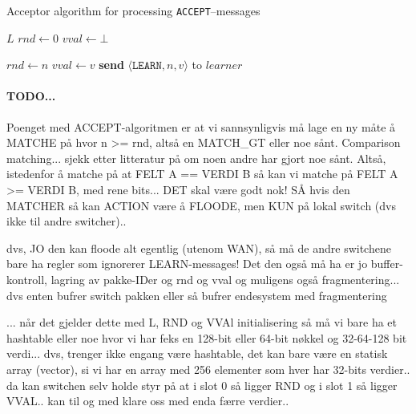 \begin{algorithm}[H]
  \caption{Acceptor algorithm for processing \texttt{ACCEPT}--messages}
  \label{paxos.algorithm.acceptor}
  \begin{algorithmic}
    \State $L$
    \State $rnd \leftarrow 0$ 
    \State $vval \leftarrow \bot$ 

        \State $rnd\gets n$
        \State $vval\gets v$
           \State \textbf{send} $\langle \texttt{LEARN}, n, v \rangle $ to $learner$
        \EndForIn
      \EndIf
    \EndOn
  \end{algorithmic}
\end{algorithm}

\paragraph{TODO...}

Poenget med ACCEPT-algoritmen er at vi sannsynligvis må lage en ny måte å
MATCHE på hvor n >= rnd, altså en MATCH\_{}GT eller noe sånt.  Comparison
matching... sjekk etter litteratur på om noen andre har gjort noe sånt.
Altså, istedenfor å matche på at FELT A == VERDI B så kan vi matche på FELT
A >= VERDI B, med rene bits... DET skal være godt nok!  SÅ hvis den MATCHER
så kan ACTION være å FLOODE, men KUN på lokal switch (dvs ikke til andre
switcher)..

dvs, JO den kan floode alt egentlig (utenom WAN), så må de
andre switchene bare ha regler som ignorerer LEARN-messages! Det den også må
ha er jo buffer-kontroll, lagring av pakke-IDer og rnd og vval og muligens
også fragmentering...  dvs enten bufrer switch pakken eller så bufrer
endesystem med fragmentering

... når det gjelder dette med L, RND og VVAl initialisering så må vi bare ha
et hashtable eller noe hvor vi har feks en 128-bit eller 64-bit nøkkel og
32-64-128 bit verdi... dvs, trenger ikke engang være hashtable, det kan bare
være en statisk array (vector), si vi har en array med 256 elementer som
hver har 32-bits verdier.. da kan switchen selv holde styr på at i slot 0 så
ligger RND og i slot 1 så ligger VVAL.. kan til og med klare oss med enda
færre verdier..

